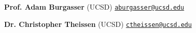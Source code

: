 \documentclass[margin,line]{resume}
\begin{document}
\begin{resume}
\textbf{Prof. Adam Burgasser} (UCSD) \hfill {\tt \href{aburgasser@ucsd.edu}{aburgasser@ucsd.edu}}  

\textbf{Dr. Christopher Theissen} (UCSD) \hfill {\tt \href{ctheissen@ucsd.edu}{ctheissen@ucsd.edu}}  




 	       
\end{resume}   
\end{document}
